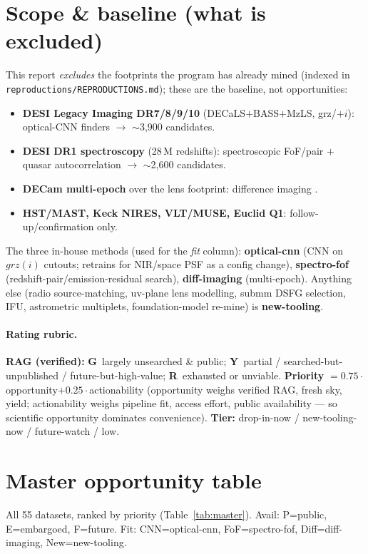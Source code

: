 \documentclass[11pt,letterpaper]{article}
\newcommand{\rgG}{\textcolor{green!55!black}{\textbf{G}}}
\newcommand{\rgY}{\textcolor{orange!85!black}{\textbf{Y}}}
\newcommand{\rgR}{\textcolor{red!72!black}{\textbf{R}}}
\begin{document}
\section{Scope \& baseline (what is excluded)}\label{sec:baseline}
This report \emph{excludes} the footprints the program has already mined (indexed in
\texttt{reproductions/REPRODUCTIONS.md}); these are the baseline, not opportunities:
\begin{itemize}[noitemsep]
  \item \textbf{DESI Legacy Imaging DR7/8/9/10} (DECaLS$+$BASS$+$MzLS, grz/$+i$): optical-CNN
  finders \citep{huang2020,huang2021,storfer2024,inchausti2025} $\to$ $\sim$3{,}900 candidates.
  \item \textbf{DESI DR1 spectroscopy} (28\,M redshifts): spectroscopic FoF/pair \citep{hsu2025}
  $+$ quasar autocorrelation \citep{dawes2023} $\to$ $\sim$2{,}600 candidates.
  \item \textbf{DECam multi-epoch} over the lens footprint: difference imaging
  \citep{sheu2023,sheu2024a}.
  \item \textbf{HST/MAST, Keck NIRES, VLT/MUSE, Euclid Q1}: follow-up/confirmation only.
\end{itemize}
The three in-house methods (used for the \emph{fit} column): \textbf{optical-cnn} (CNN on
$grz(i)$ cutouts; retrains for NIR/space PSF as a config change), \textbf{spectro-fof}
(redshift-pair/emission-residual search), \textbf{diff-imaging} (multi-epoch). Anything else
(radio source-matching, uv-plane lens modelling, submm DSFG selection, IFU, astrometric
multiplets, foundation-model re-mine) is \textbf{new-tooling}.

\paragraph{Rating rubric.} \textbf{RAG (verified):} \rgG~largely unsearched \& public;
\rgY~partial / searched-but-unpublished / future-but-high-value; \rgR~exhausted or unviable.
\textbf{Priority} $=0.75\cdot$opportunity$+0.25\cdot$actionability (opportunity weighs verified
RAG, fresh sky, yield; actionability weighs pipeline fit, access effort, public availability ---
so scientific opportunity dominates convenience). \textbf{Tier:} drop-in-now / new-tooling-now /
future-watch / low.

\section{Master opportunity table}
All 55 datasets, ranked by priority (Table~\ref{tab:master}). Avail: P=public, E=embargoed,
F=future. Fit: CNN=optical-cnn, FoF=spectro-fof, Diff=diff-imaging, New=new-tooling.
\end{document}

